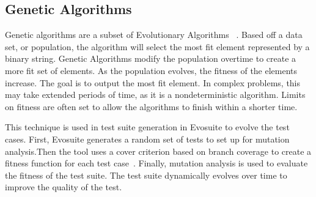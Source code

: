 \subsection{Genetic Algorithms}
Genetic algorithms are a subset of Evolutionary Algorithms ~\cite{Pandey:2012:GAC:2381716.2381766}.  Based off a data set, or population, the algorithm will select the most fit element represented by a binary string. Genetic Algorithms modify the population overtime to create a more fit set of elements. As the population evolves, the fitness of the elements increase. The goal is to output the most fit element. In complex problems, this may take extended periods of time, as it is a nondeterministic algorithm. Limits on fitness are often set to allow the algorithms to finish within a shorter time.

This technique is used in test suite generation in Evosuite to evolve the test cases. First, Evosuite generates a random set of tests to set up for mutation analysis.Then the tool uses a cover criterion based on branch coverage to create a fitness function for each test case~\cite{Whole_Test_Suite_Generation:Fraser}. Finally, mutation analysis is used to evaluate the fitness of the test suite. The test suite dynamically evolves over time to improve the quality of the test. 